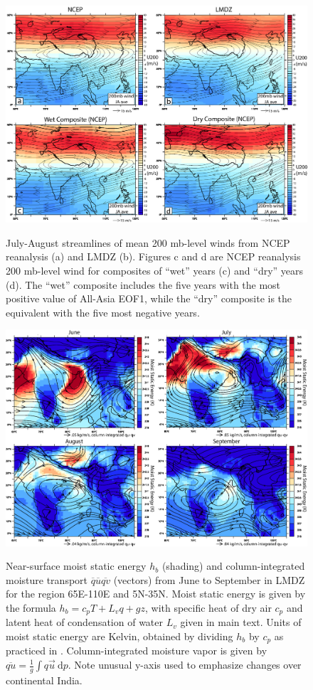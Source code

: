 \documentclass[12pt]{article}
\begin{document}
\begin{figure}[t]
  \noindent\includegraphics[width=36pc,angle=0]{fig11u200}\\
  \caption{July-August streamlines of mean 200 mb-level winds from NCEP reanalysis (a) and LMDZ (b). Figures c and d are NCEP reanalysis 200 mb-level wind for composites of ``wet'' years (c) and ``dry'' years (d). The ``wet'' composite includes the five years with the most positive value of All-Asia EOF1, while the ``dry'' composite is the equivalent with the five most negative years.}\label{f11}
\end{figure}

\begin{figure}[t]
  \noindent\includegraphics[width=36pc,angle=0]{fig12lmdz}\\
  \caption{Near-surface moist static energy $h_b$ (shading) and column-integrated moisture transport $\overline{q}\overline{u}$\textendash $\overline{qv}$ (vectors) from June to September in LMDZ for the region 65E-110E and 5N-35N. Moist static energy is given by the formula $h_b=c_pT+L_vq+gz$, with specific heat of dry air $c_p$ and latent heat of condensation of water $L_v$ given in main text. Units of moist static energy are Kelvin, obtained by dividing $h_b$ by $c_p$ as practiced in \cite{Boos2013a}. Column-integrated moisture vapor is given by $\overline{qu}=\frac{1}{g}\int q\vec{u}\ \mathrm{d}p $. Note unusual y-axis used to emphasize changes over continental India.}\label{f12}
\end{figure}
\end{document}
